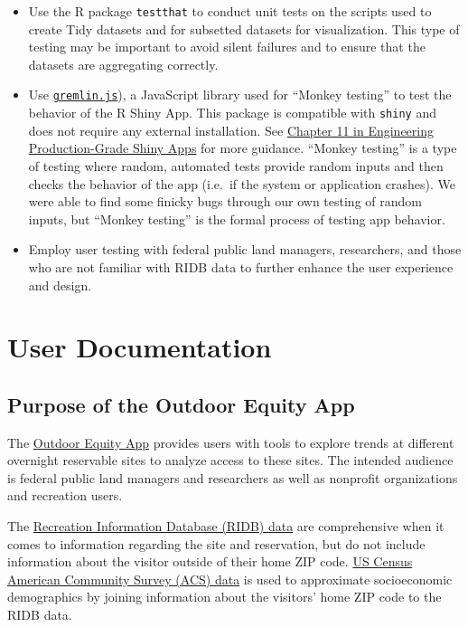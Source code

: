 \documentclass[
]{book}
\providecommand{\tightlist}{%
  \setlength{\itemsep}{0pt}\setlength{\parskip}{0pt}}
\begin{document}
\begin{itemize}
\tightlist
\item
  Use the R package \texttt{testthat} \citep{R-testthat} to conduct unit tests on the scripts used to create Tidy datasets and for subsetted datasets for visualization. This type of testing may be important to avoid silent failures and to ensure that the datasets are aggregating correctly.
\item
  Use \href{https://github.com/marmelab/gremlins.js}{\texttt{gremlin.js}}), a JavaScript library used for ``Monkey testing'' to test the behavior of the R Shiny App. This package is compatible with \texttt{shiny} \citep{R-shiny} and does not require any external installation. See \href{https://engineering-shiny.org/build-yourself-safety-net.html}{Chapter 11 in Engineering Production-Grade Shiny Apps} for more guidance. ``Monkey testing'' is a type of testing where random, automated tests provide random inputs and then checks the behavior of the app (i.e.~if the system or application crashes). We were able to find some finicky bugs through our own testing of random inputs, but ``Monkey testing'' is the formal process of testing app behavior.
\item
  Employ user testing with federal public land managers, researchers, and those who are not familiar with RIDB data to further enhance the user experience and design.
\end{itemize}

\hypertarget{user-documentation}{%
\chapter{User Documentation}\label{user-documentation}}

\hypertarget{purpose-of-the-outdoor-equity-app}{%
\section{Purpose of the Outdoor Equity App}\label{purpose-of-the-outdoor-equity-app}}

The \href{https://shinyapps.bren.ucsb.edu/oe_app/}{Outdoor Equity App} provides users with tools to explore trends at different overnight reservable sites to analyze access to these sites. The intended audience is federal public land managers and researchers as well as nonprofit organizations and recreation users.

The \href{https://ridb.recreation.gov/landing}{Recreation Information Database (RIDB) data} are comprehensive when it comes to information regarding the site and reservation, but do not include information about the visitor outside of their home ZIP code. \href{https://www.census.gov/programs-surveys/acs/data.html}{US Census American Community Survey (ACS) data} is used to approximate socioeconomic demographics by joining information about the visitors' home ZIP code to the RIDB data.
\end{document}

